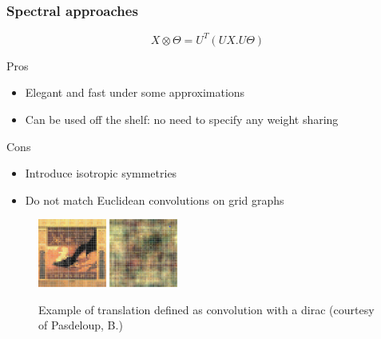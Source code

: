 \documentclass[t,9pt,pdftex]{beamer}
\theoremstyle{definition}
\begin{document}
\begin{frame}[c, label=current]
  \frametitle{Spectral approaches}
  \begin{Large}
  $$
  X \otimes \Theta = U^T(UX . U\Theta)
  $$
  \end{Large}
  Pros\\
  \begin{itemize}
  \item Elegant and fast under some approximations
  \item Can be used off the shelf: no need to specify any weight sharing
  \end{itemize}
  Cons\\
  \begin{itemize}
  \item Introduce isotropic symmetries
  \item Do not match Euclidean convolutions on grid graphs
  \end{itemize}
  \begin{figure}
  \begin{center}
  \includegraphics[width=0.2\textwidth,height=\textheight,keepaspectratio]{before_trans.png}
  \hspace{0.5in}
  \includegraphics[width=0.2\textwidth,height=\textheight,keepaspectratio]{after_trans.png}
  \end{center}
  \caption{Example of translation defined as convolution with a dirac (courtesy of Pasdeloup, B.)}
  \end{figure}
\end{frame}
\end{document}
